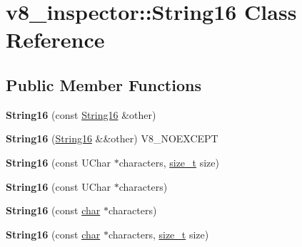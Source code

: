 \hypertarget{classv8__inspector_1_1String16}{}\section{v8\+\_\+inspector\+:\+:String16 Class Reference}
\label{classv8__inspector_1_1String16}
\subsection*{Public Member Functions}
\begin{DoxyCompactItemize}
\item 
\mbox{\label{classv8__inspector_1_1String16_a365adb0140013fd00a195f075a69f55f}} 
{\bfseries String16} (const \mbox{\hyperlink{classv8__inspector_1_1String16}{String16}} \&other)
\item 
\mbox{\label{classv8__inspector_1_1String16_aadd17a13efca0a6478d4dd1609e136c0}} 
{\bfseries String16} (\mbox{\hyperlink{classv8__inspector_1_1String16}{String16}} \&\&other) V8\+\_\+\+N\+O\+E\+X\+C\+E\+PT
\item 
\mbox{\label{classv8__inspector_1_1String16_a56154b30792e9bb099f43e2822413189}} 
{\bfseries String16} (const U\+Char $\ast$characters, \mbox{\hyperlink{classsize__t}{size\+\_\+t}} size)
\item 
\mbox{\label{classv8__inspector_1_1String16_a762b96e29a9b65c0bf4f10e566c2532d}} 
{\bfseries String16} (const U\+Char $\ast$characters)
\item 
\mbox{\label{classv8__inspector_1_1String16_a1dbce9e274d72f77397e3d5f8502141b}} 
{\bfseries String16} (const \mbox{\hyperlink{classchar}{char}} $\ast$characters)
\item 
\mbox{\label{classv8__inspector_1_1String16_af09d8c73361db28b5153cf5d61d41b8d}} 
{\bfseries String16} (const \mbox{\hyperlink{classchar}{char}} $\ast$characters, \mbox{\hyperlink{classsize__t}{size\+\_\+t}} size)
\item 
\mbox{\label{classv8__inspector_1_1String16_aed6361b7d161ee8e835d74471d6be470}} 

\end{DoxyCompactItemize}
